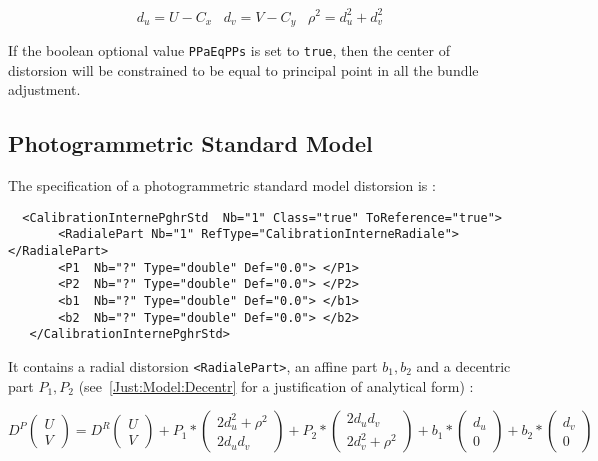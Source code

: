 \begin{equation}
    d_u =  U-C_x \;\;\; d_v=V-C_y \;\;\;
    \rho^2 = d_u ^2 + d_v ^2
\end{equation}

If the boolean optional value {\tt PPaEqPPs} is set to  {\tt true}, then the center
of distorsion will be constrained to be equal to principal point in all the bundle
adjustment.


\subsection{Photogrammetric Standard Model}

\label{SpGeo:Fraser}

The specification of a photogrammetric standard model distorsion is  :


\begin{verbatim}
  <CalibrationInternePghrStd  Nb="1" Class="true" ToReference="true">
       <RadialePart Nb="1" RefType="CalibrationInterneRadiale">    </RadialePart>
       <P1  Nb="?" Type="double" Def="0.0"> </P1>
       <P2  Nb="?" Type="double" Def="0.0"> </P2>
       <b1  Nb="?" Type="double" Def="0.0"> </b1>
       <b2  Nb="?" Type="double" Def="0.0"> </b2>
   </CalibrationInternePghrStd>
\end{verbatim}

It contains a radial distorsion {\tt <RadialePart>}, an affine part $b_1, b_2$ and
a decentric part $P_1,P_2$ (see~\ref{Just:Model:Decentr} for a justification of
analytical form) :

\begin{equation}
   D^P\begin{pmatrix} U \\ V \end{pmatrix}
      =      D^R\begin{pmatrix} U \\ V \end{pmatrix}
          +  P_1 * \begin{pmatrix} 2d_u^2 + \rho^2 \\  2 d_u d_v \end{pmatrix}
          +  P_2 * \begin{pmatrix}   2 d_u d_v \\ 2d_v^2 + \rho^2 \end{pmatrix}
          + b_1  * \begin{pmatrix}   d_u  \\ 0  \end{pmatrix}
          + b_2  * \begin{pmatrix}   d_v  \\ 0  \end{pmatrix}
\end{equation}

